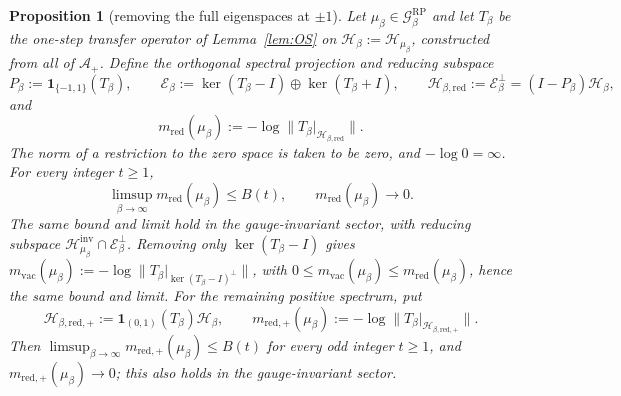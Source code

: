 \documentclass[11pt,a4paper]{article}
\theoremstyle{plain}
\newtheorem{proposition}[theorem]{Proposition}
\theoremstyle{definition}
\theoremstyle{remark}
\numberwithin{equation}{section}
\newcommand{\cG}{\mathcal{G}}
\newcommand{\cH}{\mathcal{H}}
\begin{document}
\begin{proposition}[removing the full eigenspaces at $\pm1$]\label{prop:reduced}
Let $\mu_\beta\in\cG^{\mathrm{RP}}_\beta$ and let $T_\beta$ be the one-step transfer operator of Lemma~\ref{lem:OS} on
$\cH_\beta:=\cH_{\mu_\beta}$, constructed from all of $\mathcal A_+$. Define the orthogonal spectral projection and reducing subspace
\[
P_\beta:=\mathbf1_{\{-1,1\}}(T_\beta),\qquad
\mathcal E_\beta:=\ker(T_\beta-I)\oplus\ker(T_\beta+I),\qquad
\cH_{\beta,\mathrm{red}}:=\mathcal E_\beta^\perp=(I-P_\beta)\cH_\beta,
\]
and
\[
m_{\mathrm{red}}(\mu_\beta):=-\log\|T_\beta|_{\cH_{\beta,\mathrm{red}}}\|.
\]
The norm of a restriction to the zero space is taken to be zero, and $-\log0=\infty$. For every integer $t\ge1$,
\[
\limsup_{\beta\to\infty}m_{\mathrm{red}}(\mu_\beta)\le B(t),
\qquad m_{\mathrm{red}}(\mu_\beta)\longrightarrow0.
\]
The same bound and limit hold in the gauge-invariant sector, with reducing subspace
$\cH^{\mathrm{inv}}_{\mu_\beta}\cap\mathcal E_\beta^\perp$.
Removing only $\ker(T_\beta-I)$ gives $m_{\mathrm{vac}}(\mu_\beta):=-\log\|T_\beta|_{\ker(T_\beta-I)^\perp}\|$, with
$0\le m_{\mathrm{vac}}(\mu_\beta)\le m_{\mathrm{red}}(\mu_\beta)$, hence the same bound and limit.
For the remaining positive spectrum, put
\[
\cH_{\beta,\mathrm{red},+}:=\mathbf1_{(0,1)}(T_\beta)\cH_\beta,
\qquad
m_{\mathrm{red},+}(\mu_\beta):=-\log\|T_\beta|_{\cH_{\beta,\mathrm{red},+}}\|.
\]
Then $\limsup_{\beta\to\infty}m_{\mathrm{red},+}(\mu_\beta)\le B(t)$ for every odd integer $t\ge1$, and
$m_{\mathrm{red},+}(\mu_\beta)\to0$; this also holds in the gauge-invariant sector.
\end{proposition}
\end{document}
